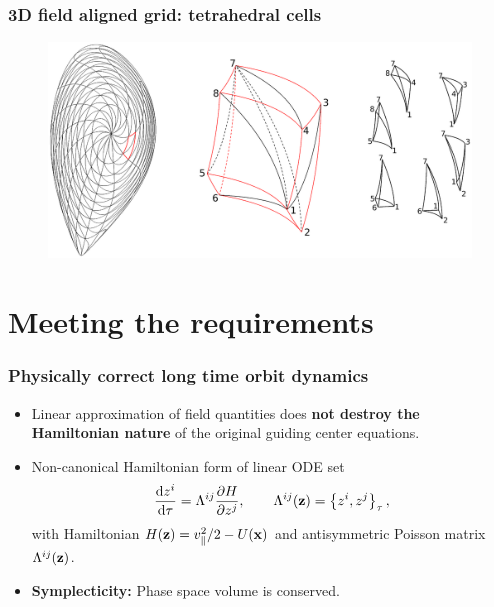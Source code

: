 \documentclass{beamer}
\newcommand{\be}[1]{\begin{equation} \label{#1}}
\newcommand{\ee}{\end{equation}}
\newcommand{\difp}[2]{\frac{\partial #1}{\partial #2}}
\newcommand{\bz}{{\bf z}}
\newcommand{\bx}{{\bf x}}
\newcommand{\rd}{{\rm d}}
\begin{document}
\begin{frame}
\frametitle{3D field aligned grid: tetrahedral cells}
\vspace{-1.7cm}
	\begin{figure}
		\hspace*{-1.65cm}\includegraphics[width=1.25\textwidth]{FIGURES/curvilinear_grid.eps}
	\end{figure}

\end{frame}

\section{Meeting the requirements}

\begin{frame}
\frametitle{Physically correct long time orbit dynamics}
\vspace{-0.5cm}
\begin{itemize}
	\item
	Linear approximation of field quantities does \textbf{not destroy the Hamiltonian nature} of the original guiding center equations.
	\item Non-canonical Hamiltonian form of linear ODE set
	\be{hamform}
	\frac{\rd z^i}{\rd \tau}=\Lambda^{ij}\difp{H}{z^j}, \qquad \Lambda^{ij}(\bz)=\left\{z^i,z^j\right\}_\tau,
	\ee
	with Hamiltonian $H(\bz)=v_\parallel^2/2-U(\bx)$ and antisymmetric Poisson matrix  $\Lambda^{ij}(\bz)$.
	\item \textbf{Symplecticity:} Phase space volume is conserved.
\end{itemize}

\end{frame}
\end{document}
